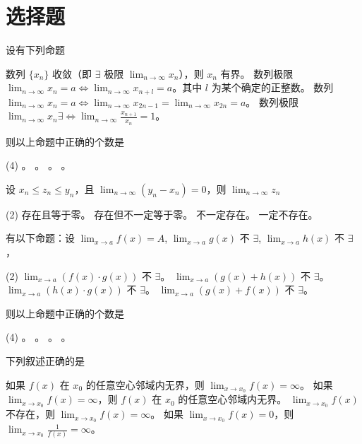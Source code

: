 \section{选择题}
\begin{ti}
	设有下列命题
	\begin{tasks}[label=(\arabic*)]
		\task 数列 $\{ x_n \}$ 收敛（即 $\exists$ 极限 $\lim_{n \to \infty} x_n$），则 $x_n$ 有界。
		\task 数列极限 $\lim_{n \to \infty} x_n = a \Leftrightarrow \lim_{n \to \infty} x_{n+l} = a$。其中 $l$ 为某个确定的正整数。
		\task 数列 $\lim_{n \to \infty} x_n = a \Leftrightarrow \lim_{n \to \infty} x_{2n-1} = \lim_{n \to \infty} x_{2n} = a$。
		\task 数列极限 $\lim_{n \to \infty} x_n \exists \Leftrightarrow \lim_{n \to \infty} \frac{x_{n+1}}{x_n} = 1$。
	\end{tasks}
	则以上命题中正确的个数是
	\begin{tasks}(4)
		。
		。
		。
		。
	\end{tasks}
\end{ti}

\begin{ti}
	设 $x_n \leq z_n \leq y_n$，且 $\lim_{n \to \infty} (y_n - x_n) = 0$，则 $\lim_{n \to \infty} z_n$
	\begin{tasks}(2)
		\task 存在且等于零。
		\task 存在但不一定等于零。
		\task 不一定存在。
		\task 一定不存在。
	\end{tasks}
\end{ti}

\begin{ti}
	有以下命题：设 $\lim_{x \to a} f(x) = A$, $\lim_{x \to a} g(x)$ 不 $\exists$, $\lim_{x \to a} h(x)$ 不 $\exists$，
	\begin{tasks}[label=(\arabic*)](2)
		\task $\lim_{x \to a} (f(x) \cdot g(x))$ 不 $\exists$。
		\task $\lim_{x \to a} (g(x) + h(x))$ 不 $\exists$。
		\task $\lim_{x \to a} (h(x) \cdot g(x))$ 不 $\exists$。
		\task $\lim_{x \to a} (g(x) + f(x))$ 不 $\exists$。
	\end{tasks}
	则以上命题中正确的个数是
	\begin{tasks}(4)
		。
		。
		。
		。
	\end{tasks}
\end{ti}

\begin{ti}
	下列叙述正确的是
	\begin{tasks}
		\task 如果 $f(x)$ 在 $x_0$ 的任意空心邻域内无界，则 $\lim_{x \to x_0} f(x) = \infty$。
		\task 如果 $\lim_{x \to x_0} f(x) = \infty$，则 $f(x)$ 在 $x_0$ 的任意空心邻域内无界。
		\task $\lim_{x \to x_0} f(x)$ 不存在，则 $\lim_{x \to x_0} f(x) = \infty$。
		\task 如果 $\lim_{x \to x_0} f(x) = 0$，则 $\lim_{x \to x_0} \frac{1}{f(x)} = \infty$。
	\end{tasks}
\end{ti}

